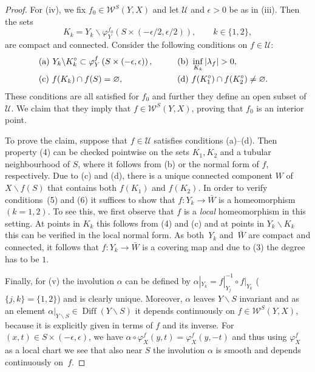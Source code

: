 \documentclass[10pt,a4paper]{amsart}
\numberwithin{equation}{section}
\theoremstyle{definition}
\newcommand{\1}{{\bf 1}}
\DeclareMathOperator{\Diff}{Diff}
\begin{document}
\begin{proof}
For (iv), we fix $f_0\in \mathcal W^S(Y,X)$ and let $\mathcal U$ and $\epsilon>0$ be as in (iii). Then the sets
\[
	K_k = Y_k \backslash \varphi_Y^{f_0}\left(S\times (-\epsilon/2,\epsilon/2)\right), \qquad k\in \{1,2\},
\]
are compact and connected. Consider the following conditions on $f\in \mathcal U$:
\begin{alignat*}{3}
&	{\rm(a)} \ Y_k\backslash K_k^\circ \subset \varphi_Y^f\left(S\times (-\epsilon,\epsilon)\right),\qquad && {\rm (b)} \  \inf_{K_k} |\lambda_f| > 0,&\\
&	{\rm (c)} \ f(K_k)\cap f(S)=\varnothing,\qquad &&{\rm (d)} \ f(K_1^\circ) \cap f(K_2^\circ) \neq \varnothing.&
\end{alignat*}
These conditions are all satisfied for $f_0$ and further they define an open subset of $\mathcal U$. We claim that they imply that $f\in \mathcal W^S(Y,X)$, proving that $f_0$ is an interior point.

To prove the claim, suppose that $f\in \mathcal U$ satisfies conditions (a)--(d). Then property (4) can be checked pointwise on the sets $K_1,K_2$ and a tubular neighbourhood of $S$, where it follows from (b) or the normal form of $f$, respectively.
Due to (c) and (d), there is a unique connected component $W$ of $X\backslash f(S)$ that contains both $f(K_1)$ and $f(K_2)$. In order to verify conditions~(5) and (6) it suffices to show that
$f\colon Y_k \to \bar W$ is a homeomorphism $(k=1,2)$.
To see this, we first observe that $f$ is a {\it local} homeomorphism in this setting. At points in $K_k$ this follows from (4) and (c) and at points in $Y_k\backslash K_k$ this can be verified in the local normal form. As both~$Y_k$ and~$\bar W$ are compact and connected, it follows that $f\colon Y_k\to \bar W$ is a covering map and due to (3) the degree has to be $1$.

Finally, for (v) the involution $\alpha$ can be defined by $\alpha|_{Y_{k}} = f|_{Y_{j}}^{-1}\circ f|_{Y_k}$ ($\{j,k\} =\{1,2\}$) and is clearly unique. Moreover, $\alpha$ leaves $Y\backslash S$ invariant and as an element $\alpha|_{Y\backslash S} \in \Diff(Y\backslash S)$ it depends continuously on $f\in \mathcal W^S(Y,X)$, because it is explicitly given in terms of $f$ and its inverse. For $(x,t)\in S\times (-\epsilon,\epsilon)$, we have $\alpha\circ\varphi_X^f(y,t) = \varphi_X^f(y,-t)$ and thus using $\varphi_X^f$ as a local chart we see that also near $S$ the involution $\alpha$ is smooth and depends continuously on~$f$.
\end{proof}
\end{document}
